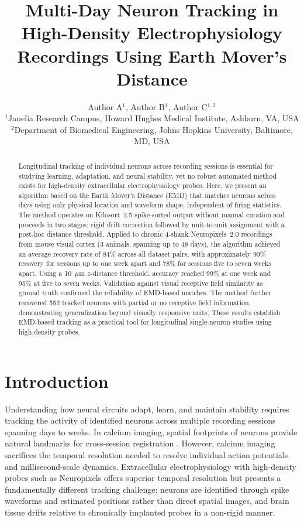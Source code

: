 \documentclass[11pt]{article}
\title{Multi-Day Neuron Tracking in High-Density Electrophysiology Recordings Using Earth Mover's Distance}
\author{Author A$^{1}$, Author B$^{1}$, Author C$^{1,2}$\\
\small $^{1}$Janelia Research Campus, Howard Hughes Medical Institute, Ashburn, VA, USA\\
\small $^{2}$Department of Biomedical Engineering, Johns Hopkins University, Baltimore, MD, USA}
\date{}
\begin{document}
\maketitle

\begin{abstract}
Longitudinal tracking of individual neurons across recording sessions is essential for studying learning, adaptation, and neural stability, yet no robust automated method exists for high-density extracellular electrophysiology probes. Here, we present an algorithm based on the Earth Mover's Distance (EMD) that matches neurons across days using only physical location and waveform shape, independent of firing statistics. The method operates on Kilosort~2.5 spike-sorted output without manual curation and proceeds in two stages: rigid drift correction followed by unit-to-unit assignment with a post-hoc distance threshold. Applied to chronic 4-shank Neuropixels~2.0 recordings from mouse visual cortex (3 animals, spanning up to 48 days), the algorithm achieved an average recovery rate of 84\% across all dataset pairs, with approximately 90\% recovery for sessions up to one week apart and 78\% for sessions five to seven weeks apart. Using a 10~$\mu$m $z$-distance threshold, accuracy reached 99\% at one week and 95\% at five to seven weeks. Validation against visual receptive field similarity as ground truth confirmed the reliability of EMD-based matches. The method further recovered 552 tracked neurons with partial or no receptive field information, demonstrating generalization beyond visually responsive units. These results establish EMD-based tracking as a practical tool for longitudinal single-neuron studies using high-density probes.
\end{abstract}

\section{Introduction}

Understanding how neural circuits adapt, learn, and maintain stability requires tracking the activity of identified neurons across multiple recording sessions spanning days to weeks. In calcium imaging, spatial footprints of neurons provide natural landmarks for cross-session registration \citep{sheintuch2017tracking, ziv2013long}. However, calcium imaging sacrifices the temporal resolution needed to resolve individual action potentials and millisecond-scale dynamics. Extracellular electrophysiology with high-density probes such as Neuropixels \citep{steinmetz2021neuropixels} offers superior temporal resolution but presents a fundamentally different tracking challenge: neurons are identified through spike waveforms and estimated positions rather than direct spatial images, and brain tissue drifts relative to chronically implanted probes in a non-rigid manner.
\end{document}
